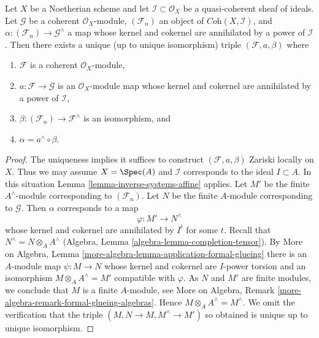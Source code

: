 \begin{lemma}
\label{lemma-existence-easy}
Let $X$ be a Noetherian scheme and let $\mathcal{I} \subset \mathcal{O}_X$
be a quasi-coherent sheaf of ideals. Let $\mathcal{G}$ be a coherent
$\mathcal{O}_X$-module, $(\mathcal{F}_n)$ an object of
$\textit{Coh}(X, \mathcal{I})$, and
$\alpha : (\mathcal{F}_n) \to \mathcal{G}^\wedge$
a map whose kernel and cokernel are annihilated by a power of $\mathcal{I}$.
Then there exists a unique (up to unique isomorphism) triple
$(\mathcal{F}, a, \beta)$ where
\begin{enumerate}
\item $\mathcal{F}$ is a coherent $\mathcal{O}_X$-module,
\item $a : \mathcal{F} \to \mathcal{G}$ is an $\mathcal{O}_X$-module map
whose kernel and cokernel are annihilated by a power of $\mathcal{I}$,
\item $\beta : (\mathcal{F}_n) \to \mathcal{F}^\wedge$ is an isomorphism, and
\item $\alpha = a^\wedge \circ \beta$.
\end{enumerate}
\end{lemma}

\begin{proof}
The uniqueness implies it suffices to construct $(\mathcal{F}, a, \beta)$
Zariski locally on $X$. Thus we may assume $X = \Spec(A)$ and $\mathcal{I}$
corresponds to the ideal $I \subset A$. In this situation
Lemma \ref{lemma-inverse-systems-affine} applies.
Let $M'$ be the finite $A^\wedge$-module corresponding
to $(\mathcal{F}_n)$. Let $N$ be the finite $A$-module corresponding to
$\mathcal{G}$. Then $\alpha$ corresponds to a map
$$
\varphi : M' \longrightarrow N^\wedge
$$
whose kernel and cokernel are annihilated by $I^t$ for some $t$. Recall that
$N^\wedge = N \otimes_A A^\wedge$
(Algebra, Lemma \ref{algebra-lemma-completion-tensor}).
By More on Algebra, Lemma \ref{more-algebra-lemma-application-formal-glueing}
there is an $A$-module map $\psi : M \to N$ whose kernel and cokernel are
$I$-power torsion and an isomorphism
$M \otimes_A A^\wedge = M'$ compatible with $\varphi$.
As $N$ and $M'$ are finite modules, we conclude that $M$
is a finite $A$-module, see
More on Algebra, Remark \ref{more-algebra-remark-formal-glueing-algebras}.
Hence $M \otimes_A A^\wedge = M^\wedge$. We omit the verification
that the triple $(M, N \to M, M^\wedge \to M')$ so obtained
is unique up to unique isomorphism.
\end{proof}

